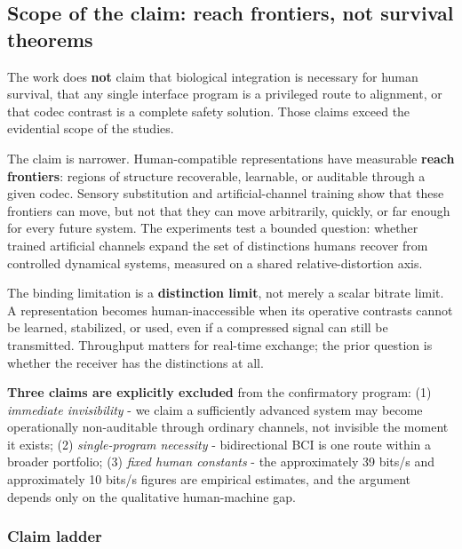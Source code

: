 \documentclass[
  11pt,
]{article}
\begin{document}
\subsection{Scope of the claim: reach frontiers, not
survival
theorems}\label{scope-of-the-claim-reach-frontiers-not-survival-theorems}

The work does \textbf{not} claim that biological
integration is necessary for human survival, that any
single interface program is a privileged route to
alignment, or that codec contrast is a complete safety
solution. Those claims exceed the evidential scope of
the studies.

The claim is narrower. Human-compatible representations
have measurable \textbf{reach frontiers}: regions of
structure recoverable, learnable, or auditable through
a given codec. Sensory substitution and
artificial-channel training show that these frontiers
can move, but not that they can move arbitrarily,
quickly, or far enough for every future system. The
experiments test a bounded question: whether trained
artificial channels expand the set of distinctions
humans recover from controlled dynamical systems,
measured on a shared relative-distortion axis.

The binding limitation is a \textbf{distinction limit},
not merely a scalar bitrate limit. A representation
becomes human-inaccessible when its operative contrasts
cannot be learned, stabilized, or used, even if a
compressed signal can still be transmitted. Throughput
matters for real-time exchange; the prior question is
whether the receiver has the distinctions at all.

\textbf{Three claims are explicitly excluded} from the
confirmatory program: (1) \emph{immediate invisibility}
- we claim a sufficiently advanced system may become
operationally non-auditable through ordinary channels,
not invisible the moment it exists; (2)
\emph{single-program necessity} - bidirectional BCI is
one route within a broader portfolio; (3) \emph{fixed
human constants} - the approximately 39 bits/s and
approximately 10 bits/s figures are empirical
estimates, and the argument depends only on the
qualitative human-machine gap.

\subsubsection{Claim ladder}\label{claim-ladder}
\end{document}

